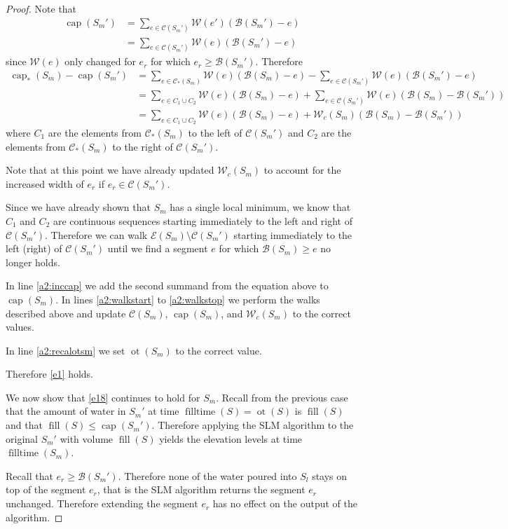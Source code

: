 \documentclass[11pt,a4paper]{article}
\newcommand{\B}{\mathcal{B}}
\newcommand{\Wc}{\mathcal{W}_c}
\newcommand{\W}{\mathcal{W}}
\newcommand{\C}{\mathcal{C}}
\newcommand{\E}{\mathcal{E}}
\DeclareMathOperator{\capp}{cap}
\DeclareMathOperator{\ot}{ot}
\DeclareMathOperator{\Fill}{fill}
\DeclareMathOperator{\filltime}{filltime}
\begin{document}
\begin{proof}
Note that
\begin{align*}
    \capp(S_m') &= \sum_{e\in\C(S_m')} \W(e')(\B(S_m')-e) \\
                &= \sum_{e\in\C(S_m')} \W(e)(\B(S_m')-e)
\end{align*}
since $\W(e)$ only changed for $e_r$ for which $e_r\ge\B(S_m')$.
Therefore
\begin{align*}
    \capp_*(S_m) - \capp(S_m') &= \sum_{e\in\C_*(S_m)} \W(e)(\B(S_m)-e) - \sum_{e\in\C(S_m')} \W(e)(\B(S_m')-e) \\
               &= \sum_{e\in C_1\cup C_2}\W(e)(\B(S_m)-e) + \sum_{e\in\C(S_m')} \W(e)(\B(S_m)-\B(S_m')) \\
               &= \sum_{e\in C_1\cup C_2}\W(e)(\B(S_m)-e) + \Wc(S_m)(\B(S_m) - \B(S_m'))
\end{align*}
where $C_1$ are the elements from $\C_*(S_m)$ to the left of $\C(S_m')$ and $C_2$ are the elements from $\C_*(S_m)$ to the right of $\C(S_m')$.

Note that at this point we have already updated $\Wc(S_m)$ to account for the increased width of $e_r$ if $e_r\in\C(S_m')$.

Since we have already shown that $S_m$ has a single local minimum, we know that $C_1$ and $C_2$ are continuous sequences starting immediately to the left and right of $\C(S_m')$.
Therefore we can walk $\E(S_m)\setminus\C(S_m')$ starting immediately to the left (right) of $\C(S_m')$ until we find a segment $e$ for which $\B(S_m)\ge e$ no longer holds.

In line \ref{a2:inccap} we add the second summand from the equation above to $\capp(S_m)$.
In lines \ref{a2:walkstart} to \ref{a2:walkstop} we perform the walks described above and update $\C(S_m)$, $\capp(S_m)$, and $\Wc(S_m)$ to the correct values.

In line \ref{a2:recalotsm} we set $\ot(S_m)$ to the correct value.

Therefore \ref{e1} holds.

We now show that \ref{e18} continues to hold for $S_m$.
Recall from the previous case that the amount of water in $S_m'$ at time $\filltime(S) = \ot(S)$ is $\Fill(S)$ and that $\Fill(S)\le\capp(S_m')$.
Therefore applying the SLM algorithm to the original $S_m'$ with volume $\Fill(S)$ yields the elevation levels at time $\filltime(S_m)$.

Recall that $e_r\ge\B(S_m')$.
Therefore none of the water poured into $S_l$ stays on top of the segment $e_r$, that is the SLM algorithm returns the segment $e_r$ unchanged.
Therefore extending the segment $e_r$ has no effect on the output of the algorithm.


\end{proof}
\end{document}
